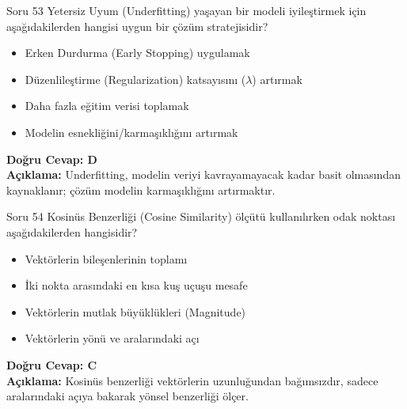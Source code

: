 \documentclass[12pt,a4paper]{article}
\begin{document}
\begin{testcard}{Soru 53}
    Yetersiz Uyum (Underfitting) yaşayan bir modeli iyileştirmek için aşağıdakilerden hangisi uygun bir çözüm stratejisidir?
    \begin{itemize}
        \item[A)] Erken Durdurma (Early Stopping) uygulamak
        \item[B)] Düzenlileştirme (Regularization) katsayısını ($\lambda$) artırmak
        \item[C)] Daha fazla eğitim verisi toplamak
        \item[D)] Modelin esnekliğini/karmaşıklığını artırmak
    \end{itemize}
    \tcblower
    \textbf{Doğru Cevap: D} \\
    \textbf{Açıklama:} Underfitting, modelin veriyi kavrayamayacak kadar basit olmasından kaynaklanır; çözüm modelin karmaşıklığını artırmaktır.
\end{testcard}

\begin{testcard}{Soru 54}
    Kosinüs Benzerliği (Cosine Similarity) ölçütü kullanılırken odak noktası aşağıdakilerden hangisidir?
    \begin{itemize}
        \item[A)] Vektörlerin bileşenlerinin toplamı
        \item[B)] İki nokta arasındaki en kısa kuş uçuşu mesafe
        \item[C)] Vektörlerin mutlak büyüklükleri (Magnitude)
        \item[D)] Vektörlerin yönü ve aralarındaki açı
    \end{itemize}
    \tcblower
    \textbf{Doğru Cevap: C} \\
    \textbf{Açıklama:} Kosinüs benzerliği vektörlerin uzunluğundan bağımsızdır, sadece aralarındaki açıya bakarak yönsel benzerliği ölçer.
\end{testcard}
\end{document}
